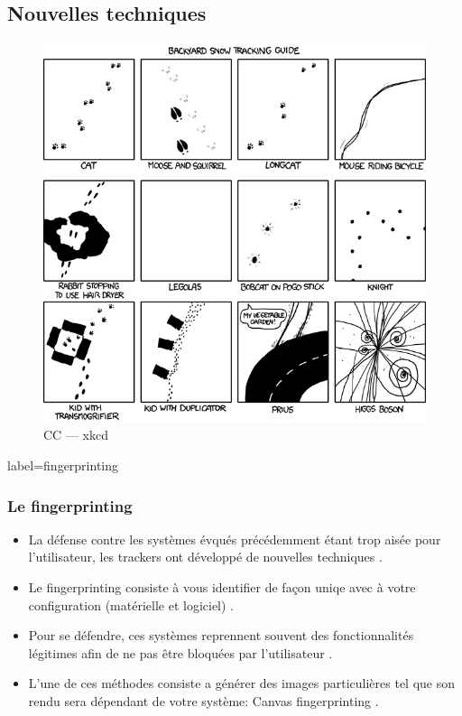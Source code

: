 \documentclass{beamer}
\begin{document}
    \subsection{Nouvelles techniques}
        \begin{frame}
            \begin{center}
                \begin{figure}
                    \includegraphics[scale=0.35]{img/snow_tracking.png}
                    \caption{CC --- xkcd}
                \end{figure}
            \end{center}
        \end{frame}
        \begin{frame}{label=fingerprinting}
            \frametitle{Le fingerprinting}
            \begin{center}
                \begin{itemize}
                    \item La défense contre les systèmes évqués précédemment étant trop aisée pour l'utilisateur, les trackers ont développé de nouvelles techniques \cite{web}.
                    \item Le fingerprinting consiste à vous identifier de façon uniqe avec à votre configuration (matérielle et logiciel) \cite{unique}.
                    \item Pour se défendre, ces systèmes reprennent souvent des fonctionnalités légitimes afin de ne pas être bloquées par l'utilisateur \cite{canvas}.
                    \item L'une de ces méthodes consiste a générer des images particulières tel que son rendu sera dépendant de votre système: Canvas fingerprinting \cite{canvas}.
                \end{itemize}
            \end{center}
        \end{frame}
\end{document}

